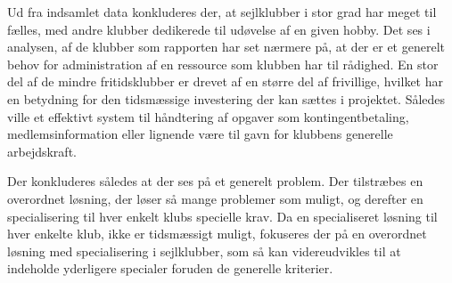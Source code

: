 Ud fra indsamlet data konkluderes der, at sejlklubber i stor grad har meget til fælles, med andre klubber dedikerede til udøvelse af en given hobby. Det ses i analysen, af de klubber som rapporten har set nærmere på, at der er et generelt behov for administration af en ressource som klubben har til rådighed. En stor del af de mindre fritidsklubber er drevet af en større del af frivillige, hvilket har en betydning for den tidsmæssige investering der kan sættes i projektet. Således ville et effektivt system til håndtering af opgaver som kontingentbetaling, medlemsinformation eller lignende være til gavn for klubbens generelle arbejdskraft.

Der konkluderes således at der ses på et generelt problem. Der tilstræbes en overordnet løsning, der løser så mange problemer som muligt, og derefter en specialisering til hver enkelt klubs specielle krav. Da en specialiseret løsning til hver enkelte klub, ikke er tidsmæssigt muligt, fokuseres der på en overordnet løsning med specialisering i sejlklubber, som så kan videreudvikles til at indeholde yderligere specialer foruden de generelle kriterier.

